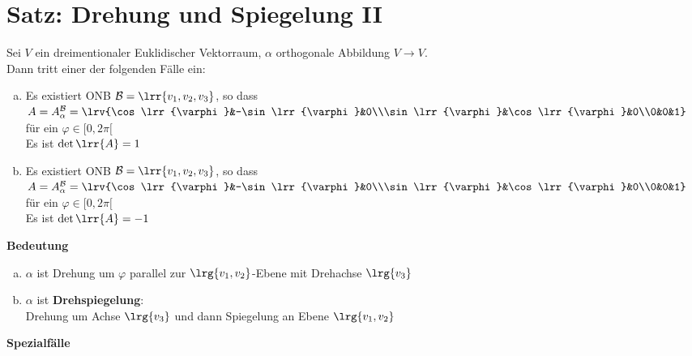 \section{Satz: Drehung und Spiegelung II}
	Sei $V$ ein dreimentionaler Euklidischer Vektorraum, $\alpha$ orthogonale Abbildung $V\rightarrow V$.\\
	Dann tritt einer der folgenden Fälle ein:
	\begin{enumerate}[a)]
		\item Es existiert ONB $\mathcal{B}=\lrr{v_1,v_2,v_3}$, so dass $A=A_{\alpha}^{\mathcal{B}}=\lrv{\cos\lrr{\varphi}&-\sin\lrr{\varphi}&0\\\sin\lrr{\varphi}&\cos\lrr{\varphi}&0\\0&0&1}$ für ein $\varphi\in [0,2\pi[$\\
			Es ist $\det\lrr{A}=1$
		\item Es existiert ONB $\mathcal{B}=\lrr{v_1,v_2,v_3}$, so dass $A=A_{\alpha}^{\mathcal{B}}=\lrv{\cos\lrr{\varphi}&-\sin\lrr{\varphi}&0\\\sin\lrr{\varphi}&\cos\lrr{\varphi}&0\\0&0&1}$ für ein $\varphi\in [0,2\pi[$\\
			Es ist $\det\lrr{A}=-1$
	\end{enumerate}
	\textbf{Bedeutung}
	\begin{enumerate}[a)]
		\item $\alpha$ ist Drehung um $\varphi$ parallel zur $\lrg{v_1,v_2}$-Ebene mit Drehachse $\lrg{v_3}$
			
		
		\item $\alpha$ ist \textbf{Drehspiegelung}:\\
			Drehung um Achse $\lrg{v_3}$ und dann Spiegelung an Ebene $\lrg{v_1,v_2}$
	\end{enumerate}
	\textbf{Spezialfälle}
